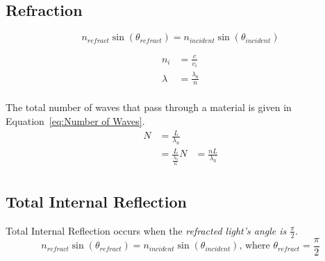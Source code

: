 	\subsection{Refraction} \label{subsec:Refraction}
		\begin{definition} \label{def:Snell's Law}
			\begin{equation} \label{eq:Refracted Light} 
				n_{refract} \sin \left( \theta_{refract} \right) = n_{incident} \sin \left( \theta_{incident} \right)
			\end{equation}
		\end{definition}
		\begin{definition} \label{def:Index of Refraction}
			\begin{equation} \label{eq:Index of Refraction}
				\begin{aligned}
					n_{i} &= \frac{c}{v_{i}} \\
					\lambda &= \frac{\lambda_{0}}{n} \\
				\end{aligned}
			\end{equation}
		\end{definition}
	The total number of waves that pass through a material is given in Equation~\eqref{eq:Number of Waves}.
		\begin{equation} \label{eq:Number of Waves}
			\begin{aligned}
				N &= \frac{L}{\lambda_{n}} \\
				&= \frac{L}{\frac{\lambda_{0}}{n}}
				N &= \frac{nL}{\lambda_{0}} \\
			\end{aligned}
		\end{equation}
		
	\subsection{Total Internal Reflection} \label{subsec:Total Internal Reflection}
		\begin{definition} \label{def:Total Internal Reflection}
			Total Internal Reflection occurs when the \emph{refracted light's angle is $\frac{\pi}{2}$}.
			\begin{equation} \label{eq:Total Internal Reflection}
				n_{refract} \sin \left( \theta_{refract} \right) = n_{incident} \sin \left( \theta_{incident} \right) \text{, where } \theta_{refract} = \frac{\pi}{2}
			\end{equation}
		\end{definition}
		
